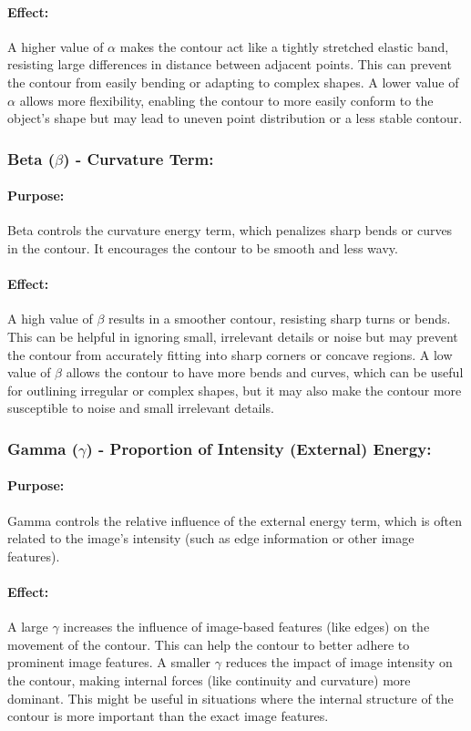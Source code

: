\documentclass[12pt,a4paper]{report}
\begin{document}
\paragraph*{Effect:}
A higher value of \(\alpha\) makes the contour act like a tightly stretched elastic band, resisting large differences in distance between adjacent points. This can prevent the contour from easily bending or adapting to complex shapes.
A lower value of \(\alpha\) allows more flexibility, enabling the contour to more easily conform to the object's shape but may lead to uneven point distribution or a less stable contour.

\subsubsection*{Beta (\(\beta\)) - Curvature Term:}
\paragraph*{Purpose:} 
Beta controls the curvature energy term, which penalizes sharp bends or curves in the contour. It encourages the contour to be smooth and less wavy.
\paragraph*{Effect:}
A high value of \(\beta\) results in a smoother contour, resisting sharp turns or bends. This can be helpful in ignoring small, irrelevant details or noise but may prevent the contour from accurately fitting into sharp corners or concave regions.
A low value of \(\beta\) allows the contour to have more bends and curves, which can be useful for outlining irregular or complex shapes, but it may also make the contour more susceptible to noise and small irrelevant details.

\subsubsection*{Gamma (\(\gamma\)) -  Proportion of Intensity (External) Energy:}
\paragraph*{Purpose:} 
Gamma controls the relative influence of the external energy term, which is often related to the image's intensity (such as edge information or other image features).
\paragraph*{Effect:}
A large \(\gamma\)  increases the influence of image-based features (like edges) on the movement of the contour. This can help the contour to better adhere to prominent image features.
A smaller \(\gamma\) reduces the impact of image intensity on the contour, making internal forces (like continuity and curvature) more dominant. This might be useful in situations where the internal structure of the contour is more important than the exact image features.
\end{document}
